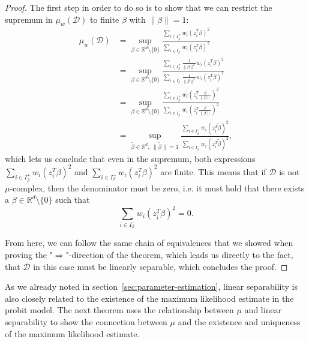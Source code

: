 \begin{proof}
    The first step in order to do so is to show that we can restrict the
    supremum in $\mu_w(\mathcal{D})$ to finite $\beta$ with
    $\lVert \beta \rVert = 1$:
    \begin{align*}
        \mu_w(\mathcal{D}) & = \sup_{\beta \in \mathbb{R}^d \setminus \{0\}}
        \frac{\sum_{i \in I_\beta^+} w_i (z_i^T \beta)^2}
        {\sum_{i \in I_\beta^-} w_i (z_i^T \beta)^2}                                         \\ & =
        \sup_{\beta \in \mathbb{R}^d \setminus \{0\}}
        \frac{\sum_{i \in I_\beta^+} \frac{1}{\lVert \beta \rVert^2}w_i (z_i^T \beta)^2}
        {\sum_{i \in I_\beta^-} \frac{1}{\lVert \beta \rVert^2} w_i (z_i^T \beta)^2}         \\
                           & =
        \sup_{\beta \in \mathbb{R}^d \setminus \{0\}}
        \frac{\sum_{i \in I_\beta^+} w_i \left(z_i^T \frac{\beta}{\lVert \beta \rVert}\right)^2}
        {\sum_{i \in I_\beta^-}  w_i \left(z_i^T \frac{\beta}{\lVert \beta \rVert}\right)^2} \\
                           & =
        \sup_{\tilde\beta \in \mathbb{R}^d,\ \lVert \tilde\beta \rVert = 1}
        \frac{\sum_{i \in I_\beta^+} w_i \left(z_i^T \tilde\beta \right)^2}
        {\sum_{i \in I_\beta^-}  w_i \left(z_i^T \tilde\beta \right)^2},
    \end{align*}
    which lets us conclude that even in the supremum, both expressions
    $\sum_{i \in I_\beta^+} w_i (z_i^T \beta )^2$
    and
    $\sum_{i \in I_\beta^-}  w_i (z_i^T \beta )^2$
    are finite.
    This means that if $\mathcal{D}$ is not $\mu$-complex, then
    the denominator must be zero, i.e. it must hold that there exists
    a $\beta \in \mathbb{R}^d \setminus \{0\}$ such that
    \begin{equation*}
        \sum_{i \in I_\beta^-}  w_i (z_i^T \beta )^2 = 0.
    \end{equation*}

    From here, we can follow the same chain of equivalences that we
    showed when proving the "$\Rightarrow$"-direction of the theorem,
    which leads us directly to the fact, that $\mathcal{D}$ in this case must
    be linearly separable, which concludes the proof.
\end{proof}

As we already noted in section~\ref{sec:parameter-estimation},
linear separability is also closely related to the existence
of the maximum likelihood estimate in the probit model.
The next theorem uses the relationship between $\mu$ and
linear separability to show the connection between $\mu$
and the existence and uniqueness of the maximum likelihood estimate.

